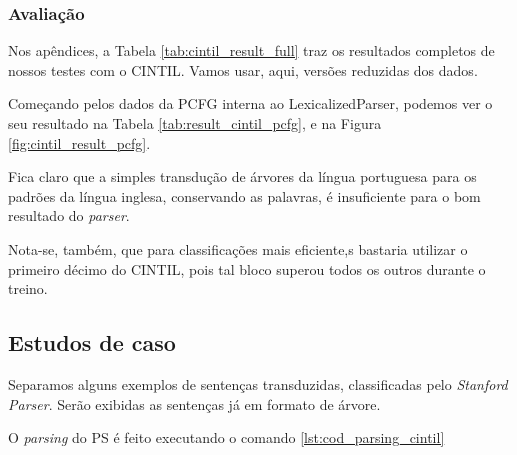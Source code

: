 \subsubsection{Avaliação} \label{result_aval_cintil}
Nos apêndices, a Tabela \ref{tab:cintil_result_full} traz os resultados completos de nossos testes com o CINTIL. Vamos usar, aqui, versões reduzidas dos dados.

Começando pelos dados da PCFG interna ao LexicalizedParser, podemos ver o seu resultado na Tabela \ref{tab:result_cintil_pcfg}, e na Figura \ref{fig:cintil_result_pcfg}.
\begin{center}
    
\end{center}
Fica claro que a simples transdução de árvores da língua portuguesa para os padrões da língua inglesa, conservando as palavras, é insuficiente para o bom resultado do \textit{parser}.

Nota-se, também, que para classificações mais eficiente,s bastaria utilizar o primeiro décimo do CINTIL, pois tal bloco superou todos os outros durante o treino.
\begin{center}
    
\end{center}

\subsection{Estudos de caso}
\label{subsec:ec_cintil}
Separamos alguns exemplos de sentenças transduzidas, classificadas pelo \textit{Stanford Parser}. Serão exibidas as sentenças já em formato de árvore. 

O \textit{parsing} do PS é feito executando o comando \ref{lst:cod_parsing_cintil}
\begin{center}
    
\end{center}

